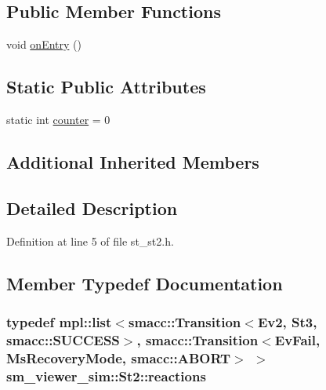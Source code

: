 \subsection*{Public Member Functions}
\begin{DoxyCompactItemize}
\item 
void \hyperlink{structsm__viewer__sim_1_1St2_af71699583a65b935221621956c6900da}{on\+Entry} ()
\end{DoxyCompactItemize}
\subsection*{Static Public Attributes}
\begin{DoxyCompactItemize}
\item 
static int \hyperlink{structsm__viewer__sim_1_1St2_ab488bf5ee92dbf4652b5b01830b37849}{counter} = 0
\end{DoxyCompactItemize}
\subsection*{Additional Inherited Members}


\subsection{Detailed Description}


Definition at line 5 of file st\+\_\+st2.\+h.



\subsection{Member Typedef Documentation}
\subsubsection[{\texorpdfstring{reactions}{reactions}}]{\setlength{\rightskip}{0pt plus 5cm}typedef mpl\+::list$<${\bf smacc\+::\+Transition}$<${\bf Ev2}, {\bf St3}, {\bf smacc\+::\+S\+U\+C\+C\+E\+SS}$>$, {\bf smacc\+::\+Transition}$<${\bf Ev\+Fail}, {\bf Ms\+Recovery\+Mode}, {\bf smacc\+::\+A\+B\+O\+RT}$>$ $>$ {\bf sm\+\_\+viewer\+\_\+sim\+::\+St2\+::reactions}}\hypertarget{structsm__viewer__sim_1_1St2_a37c15b5bdaf67bc96605679263915de8}{}\label{structsm__viewer__sim_1_1St2_a37c15b5bdaf67bc96605679263915de8}


